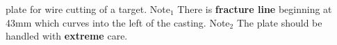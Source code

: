 \label{fig:Casting} \MgZnCa plate for wire cutting of a target. Note$_{1}$ There is \textbf{fracture line} beginning at 43mm which curves into the left of the casting. Note$_{2}$ The plate should be handled with \textbf{extreme} care.